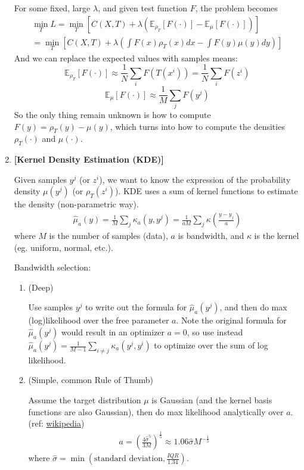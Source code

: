 \documentclass[11pt]{article}
\begin{document}
\begin{enumerate}
    For some fixed, large $\lambda$, and given test function $F$, the problem becomes
    \begin{align}
    \label{eq3}
        \min_T L 
        = \min_T \left[C(X,T) + \lambda (\mathbb{E}_{\rho_{T}} [F(\cdot)] - \mathbb{E}_{\mu} [F(\cdot)]) \right]\\
        = \min_T \left[C(X,T) + \lambda (\int F(x)\rho_T(x) dx - \int F(y)\mu(y) dy) \right]
    \end{align}
    And we can replace the expected values with samples means:
    $$
    \mathbb{E}_{\rho_{T}} [F(\cdot)] \approx \frac{1}{N} \sum_i F(T(x^i))
    = \frac{1}{N} \sum_i F(z^i)
    $$
    $$
    \mathbb{E}_{\mu} [F(\cdot)] \approx \frac{1}{M} \sum_j F(y^j)
    $$
    So the only thing remain unknown is how to compute $F(y) = \rho_T(y) - \mu(y)$, which turns into how to compute the densities $\rho_T(\cdot)$ and $\mu(\cdot)$.
    
    \item {\bf [Kernel Density Estimation (KDE)]}
    
    Given samples $y^j$ (or $z^i$), we want to know the expression of the probability density $\mu(y^j)$ (or $\rho_T(z^i)$). KDE uses a sum of kernel functions to estimate the density (non-parametric way).
    \begin{align*}
        \hat{\mu}_a(y) = \frac{1}{M} \sum_j \kappa_a(y,y^j)
        = \frac{1}{aM} \sum_j \kappa(\frac{y-y_j}{a})
    \end{align*}
    where $M$ is the number of samples (data), $a$ is bandwidth, and $\kappa$ is the kernel (eg. uniform, normal, etc.).
    
    Bandwidth selection:
    \begin{enumerate}
        \item (Deep)
        
        Use samples $y^j$ to write out the formula for $\hat{\mu}_a(y^j)$, and then do max (log)likelihood over the free parameter $a$. Note the original formula for $\hat{\mu}_a(y^j)$ would result in an optimizer $a=0$, so use instead $\hat{\mu}_a(y^j) = \frac{1}{M-1} \sum_{i\ne j} \kappa_a(y^j,y^i)$ to optimize over the sum of log likelihood.
        
        \item (Simple, common Rule of Thumb)
        
        Assume the target distribution $\mu$ is Gaussian (and the kernel basis functions are also Gaussian), then do max likelihood analytically over $a$. (ref: \href{https://en.wikipedia.org/wiki/Kernel_density_estimation}{wikipedia})
        \begin{align*}
            a = (\frac{4\hat{\sigma}^5}{3M})^{\frac{1}{5}} \approx
            1.06 \hat{\sigma} M^{-\frac{1}{5}}
        \end{align*}
        where $\hat{\sigma} = \min (\text{standard deviation}, \frac{IQR}{1.34})$.
        

\end{enumerate}
\end{enumerate}
\end{document}

